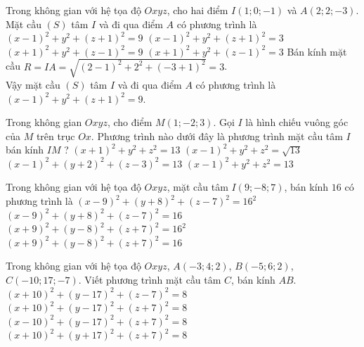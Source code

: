 \begin{ex}%
	Trong không gian với hệ tọa độ $Oxyz$, cho  hai điểm $I\left(1;0;-1\right)$ và $A\left(2;2;-3\right)$. Mặt cầu $(S)$ tâm $I$ và đi qua điểm $A$ có phương trình là
	 \choice
		 {$\left(x-1\right)^2+y^2+\left(z+1\right)^2=9$}
		{\True  $\left(x-1\right)^2+y^2+\left(z+1\right)^2=3$}
		{$\left(x+1\right)^2+y^2+\left(z-1\right)^2=9$} 
		{$\left(x+1\right)^2+y^2+\left(z-1\right)^2=3$} 
		Bán kính mặt cầu $R=IA=\sqrt{\left(2-1\right)^2+2^2+\left(-3+1\right)^2}=3$.\\ 
		Vậy mặt  cầu $(S)$ tâm $I$ và đi qua điểm $A$ có phương trình là $\left(x-1\right)^2+y^2+\left(z+1\right)^2=9$.
\end{ex}

\begin{ex}%
	Trong không gian $Oxyz$, cho điểm $M\left(1;-2;3\right)$. Gọi $I$ là hình chiếu vuông góc của $M$ trên trục $Ox$. Phương trình nào dưới đây là  phương trình mặt cầu tâm $I$ bán kính $IM$ ?
	\choice 
		{$\left(x+1\right)^2+y^2+z^2=13$} 
		 {$\left(x-1\right)^2+y^2+z^2=\sqrt{13}$}
		{$\left(x-1\right)^2+\left(y+2\right)^2+\left(z-3\right)^2=13$} 
		{\True  $\left(x-1\right)^2+y^2+z^2=13$}
\end{ex}

\begin{ex}%
	Trong không gian với hệ tọa độ $Oxyz$, mặt  cầu tâm $I(9;-8;7)$, bán kính $16$ có phương trình là
	\choice 
		 {\True $(x-9)^2+(y+8)^2+(z-7)^2=16^2$}
		 {$(x-9)^2+(y+8)^2+(z-7)^2=16$}
		{$(x+9)^2+(y-8)^2+(z+7)^2=16^2$} 
		 {$(x+9)^2+(y-8)^2+(z+7)^2=16$}
\end{ex}

\begin{ex}%
	Trong không gian với hệ tọa độ $Oxyz$, $A\left(-3;4;2\right)$, $B\left(-5;6;2\right)$, $C\left(-10;17;-7\right)$. Viết phương trình  mặt cầu tâm $C$, bán kính $AB$.
	\choice 
		 {$\left(x+10\right)^2+\left(y-17\right)^2+\left(z-7\right)^2=8$}
		{\True $\left(x+10\right)^2+\left(y-17\right)^2+\left(z+7\right)^2=8$} 
		 {$\left(x-10\right)^2+\left(y-17\right)^2+\left(z+7\right)^2=8$}
		 {$\left(x+10\right)^2+\left(y+17\right)^2+\left(z+7\right)^2=8$}
\end{ex}

